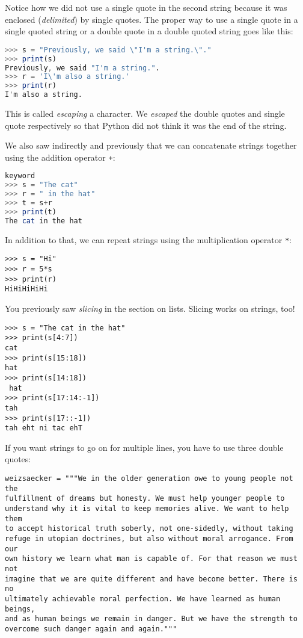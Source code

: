 \documentclass[11pt]{cselabheader}
\begin{document}
Notice how we did not use a single quote in the second string because it was
enclosed (\emph{delimited}) by single quotes. The proper way to use a single
quote in a single quoted string or a double quote in a double quoted string
goes like this:
\begin{lstlisting}[style=ipython,language=Octave]
>>> s = "Previously, we said \"I'm a string.\"."
>>> print(s)
Previously, we said "I'm a string.".
>>> r = 'I\'m also a string.'
>>> print(r)
I'm also a string.
\end{lstlisting}
This is called \emph{escaping} a character. We \emph{escaped} the double quotes
and single quote respectively so that Python did not think it was the end of
the string.


We also saw indirectly and previously that we can concatenate strings together
using the addition operator \lstinline!+!:
\begin{lstlisting}[style=ipython,language=Octave] % octave doesn't have in
keyword
>>> s = "The cat"
>>> r = " in the hat"
>>> t = s+r
>>> print(t)
The cat in the hat
\end{lstlisting}

In addition to that, we can repeat strings using the multiplication operator
\lstinline!*!: 
\begin{lstlisting}[style=ipython]
>>> s = "Hi"
>>> r = 5*s
>>> print(r)
HiHiHiHiHi
\end{lstlisting}


You previously saw \emph{slicing} in the section on lists. Slicing works on strings, too!
\begin{lstlisting}[style=ipython]
>>> s = "The cat in the hat"
>>> print(s[4:7])
cat
>>> print(s[15:18])
hat
>>> print(s[14:18])
 hat
>>> print(s[17:14:-1])
tah
>>> print(s[17::-1])
tah eht ni tac ehT
\end{lstlisting}

If you want strings to go on for multiple lines, you have to use three double
quotes:
\begin{lstlisting}
weizsaecker = """We in the older generation owe to young people not the 
fulfillment of dreams but honesty. We must help younger people to 
understand why it is vital to keep memories alive. We want to help them 
to accept historical truth soberly, not one-sidedly, without taking 
refuge in utopian doctrines, but also without moral arrogance. From our
own history we learn what man is capable of. For that reason we must not
imagine that we are quite different and have become better. There is no
ultimately achievable moral perfection. We have learned as human beings,
and as human beings we remain in danger. But we have the strength to 
overcome such danger again and again."""
\end{lstlisting} 
\end{document}
